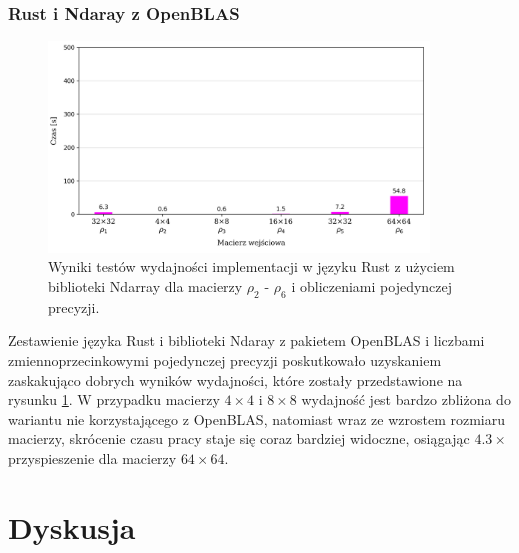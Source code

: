 \documentclass[11pt, a4paper]{article}
\begin{document}
\begin{sloppypar}
    \subsubsection{ Rust i Ndaray z OpenBLAS }


    \FloatBarrier
    \begin{figure}[ht]
      \centering
      \includegraphics[width=0.9\textwidth]{"resources/rust_blas_single_tests.png"}
      \caption{Wyniki testów wydajności implementacji w języku Rust z użyciem biblioteki Ndarray dla macierzy $\rho
      _{2}$ - $\rho_{6}$ i obliczeniami pojedynczej precyzji.}
      \label{sp-rust-blas-perf}
    \end{figure}
    \FloatBarrier

    Zestawienie języka Rust i biblioteki Ndaray z pakietem OpenBLAS i liczbami zmiennoprzecinkowymi
    pojedynczej precyzji poskutkowało uzyskaniem zaskakująco dobrych wyników wydajności,
    które zostały przedstawione na rysunku \ref{sp-rust-blas-perf}. W przypadku macierzy
    $4\times4$ i $8\times8$ wydajność jest bardzo zbliżona do wariantu nie korzystającego
    z OpenBLAS, natomiast wraz ze wzrostem rozmiaru macierzy, skrócenie czasu pracy staje
    się coraz bardziej widoczne, osiągając $4.3\times$ przyspieszenie dla macierzy
    $64\times64$.

    \section{Dyskusja}
  \end{sloppypar}
  \newpage
  \begin{sloppypar}
    \medskip


    \printbibliography
    [heading=bibintoc, title={Odwołania}]
  \end{sloppypar}
\end{document}
